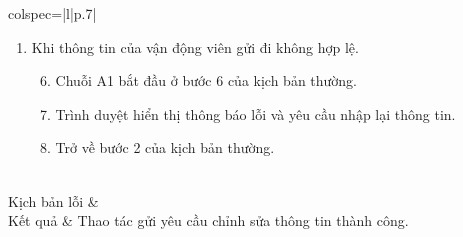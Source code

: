 \documentclass{article}
\begin{document}
\begin{longtblr}[caption = {Đặc tả usecase Gửi yêu cầu chỉnh sửa thông tin cá nhân},
label = {tab:usecase1-spec},]{colspec={|l|p{.7\linewidth}|}}
\begin{minipage}{\linewidth}
\vskip 4pt
\begin{enumerate}[label={\textbf{\textcolor{red}{A\arabic*}} --}, align=left, itemsep=-5pt]
\item Khi thông tin của vận động viên gửi đi không hợp lệ. \\
\vspace{-1.5em}
\begin{enumerate}[leftmargin=-5px, align=left, label=\arabic*.]
\setcounter{enumii}{5}
\item[]
\hspace{-25px} Chuỗi A1 bắt đầu ở bước 6 của kịch bản thường.
\item Trình duyệt hiển thị thông báo lỗi và yêu cầu nhập lại thông tin.
\item[]
\hspace{-25px} Trở về bước 2 của kịch bản thường.
\end{enumerate}
\end{enumerate}
\vskip 1pt
\end{minipage}
\\\hline
Kịch bản lỗi & \\\hline
Kết quả & Thao tác gửi yêu cầu chỉnh sửa thông tin thành công. \\\hline
\end{longtblr}
\end{document}

